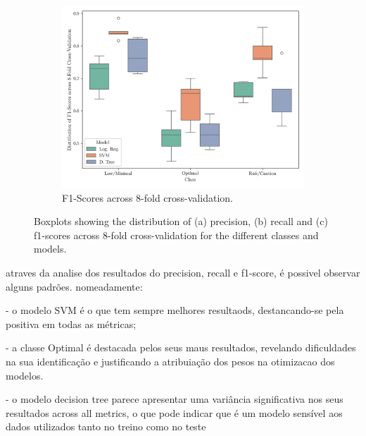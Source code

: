 \documentclass[conference]{IEEEtran}
\begin{document}
\begin{figure}[H]
    \vspace{0.5cm}

    \begin{subfigure}[1]{\linewidth}
        \centering
        \includegraphics[width=1\linewidth]{assets/box_f1score.png}
        \caption{F1-Scores across 8-fold cross-validation.}
        \label{box_f1score}
    \end{subfigure}
    
    \caption{Boxplots showing the distribution of (a) precision, (b) recall and (c) f1-scores across 8-fold cross-validation for the different classes and models.}
    \label{box_plots1}
\end{figure}

atraves da analise dos resultados do precision, recall e f1-score, é possivel observar alguns padrões. nomeadamente:

- o modelo SVM é o que tem sempre melhores resultaods, destancando-se pela positiva em todas as métricas;

- a classe Optimal é destacada pelos seus maus resultados, revelando dificuldades na sua identificação e justificando a atribuiação dos pesos na otimizacao dos modelos.

- o modelo decision tree parece apresentar uma variância significativa nos seus resultados across all metrics, o que pode indicar que é um modelo sensível aos dados utilizados tanto no treino como no teste
\end{document}
